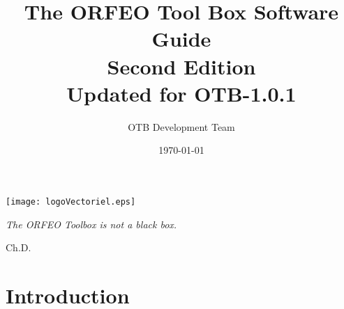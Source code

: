 \documentclass{InsightSoftwareGuide}
\title{The ORFEO Tool Box Software Guide\\ Second Edition\\ Updated
  for OTB-1.0.1}
\author{OTB Development Team}
\date{\today}
\newif\ifitkPrintedVersion
\begin{document}
\ifitkPrintedVersion
\fi

\maketitle

\frontmatter




%
%
\cleardoublepage

\begin{minipage}[t][10cm][b]{\textwidth}
\center
\texttt{[image: logoVectoriel.eps]}
\large
\begin{center}
\emph{The ORFEO Toolbox is not a black box.}\\
\end{center}
\hspace{8cm} Ch.D.
\normalsize
\end{minipage}



%
\pagestyle{plain}
%









%
%


%
\pagestyle{normal}
%
\small
\tableofcontents
\listoffigures
\listoftables
\normalsize




% 
% 

\mainmatter

\part{Introduction}
\end{document}
